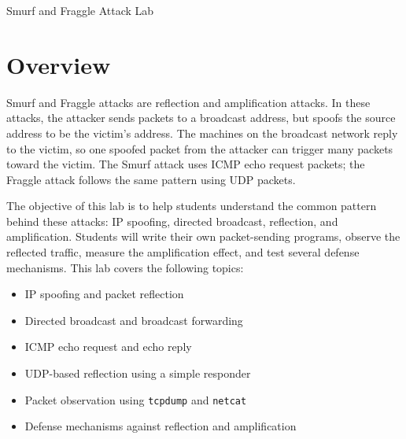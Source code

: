 
\newcommand{\commonfolder}{../../common-files}




\newcommand{\smurflab}{\texttt{Smurf/Fraggle}\xspace}
\newcommand{\attacker}{\texttt{AS-150}\xspace}
\newcommand{\victim}{\texttt{AS-151}\xspace}
\newcommand{\amplifier}{\texttt{AS-152}\xspace}
\newcommand{\fraggleport}{\texttt{7000}\xspace}



\begin{center}
{\LARGE Smurf and Fraggle Attack Lab}
\end{center}



\section{Overview}

Smurf and Fraggle attacks are reflection and amplification attacks. In these
attacks, the attacker sends packets to a broadcast address, but spoofs the
source address to be the victim's address. The machines on the broadcast
network reply to the victim, so one spoofed packet from the attacker can trigger
many packets toward the victim. The Smurf attack uses ICMP echo request packets;
the Fraggle attack follows the same pattern using UDP packets.

The objective of this lab is to help students understand the common pattern
behind these attacks: IP spoofing, directed broadcast, reflection, and
amplification. Students will write their own packet-sending programs, observe
the reflected traffic, measure the amplification effect, and test several
defense mechanisms. This lab covers the following topics:

\begin{itemize}[noitemsep]
\item IP spoofing and packet reflection
\item Directed broadcast and broadcast forwarding
\item ICMP echo request and echo reply
\item UDP-based reflection using a simple responder
\item Packet observation using \texttt{tcpdump} and \texttt{netcat}
\item Defense mechanisms against reflection and amplification
\end{itemize}


